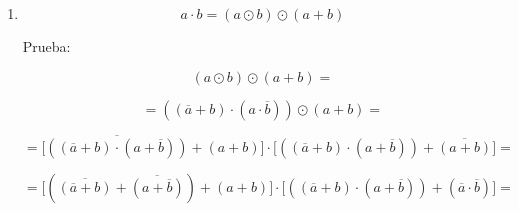 \documentclass[
]{article}
\begin{document}
\begin{enumerate}
\begin{enumerate}
\begin{enumerate}
\begin{enumerate}
        Prueba:

        \[{({a \oplus b})} \oplus {{({a \cdot b})} =}\]

        \[{= {({{({\overline{a} \cdot b})} + {({a \cdot \overline{b}})}})}} \oplus {{({a \cdot b})} =}\]

        \[{= {{\lbrack{\overline{({{({\overline{a}\cdot b})}+{({a\cdot\overline{b}})}})} \cdot {({a \cdot b})}}\rbrack} + {\lbrack{{({{({\overline{a} \cdot b})} + {({a \cdot \overline{b}})}})} \cdot \overline{({a\cdot b})}}\rbrack}}} =\]

        \[{= {{\lbrack{{({\overline{({\overline{a}\cdot b})} \cdot \overline{({a\cdot\overline{b}})}})} \cdot {({a \cdot b})}}\rbrack} + {\lbrack{{({{({\overline{a} \cdot b})} + {({a \cdot \overline{b}})}})} \cdot {({\overline{a} + \overline{b}})}}\rbrack}}} =\]

        \[{= {{\lbrack{{({{({a + \overline{b}})} \cdot {({\overline{a} + b})}})} \cdot {({a \cdot b})}}\rbrack} + {\lbrack{{({{({\overline{a} \cdot b})} + {({a \cdot \overline{b}})}})} \cdot {({\overline{a} + \overline{b}})}}\rbrack}}} =\]

        \[{= {{\lbrack{({a \cdot b})}\rbrack} + {\lbrack{({{({\overline{a} \cdot b})} + {({a \cdot \overline{b}})}})}\rbrack}}} =\]

        \[{= {{{({a \cdot b})} + {({\overline{a} \cdot b})}} + {({a \cdot \overline{b}})}}} =\]

        \[{= {{\lbrack{{({a \cdot b})} + {({\overline{a} \cdot b})}}\rbrack} + {\lbrack{{({a \cdot b})} + {({a \cdot \overline{b}})}}\rbrack}}} =\]

        \[{= {{\lbrack b\rbrack} + {\lbrack a\rbrack}}} =\]

        \[= {a + b}\]
      \item
        \[{{a \cdot b} = {({a \odot b})}} \odot {({a + b})}\]

        Prueba:

        \[{({a \odot b})} \odot {{({a + b})} =}\]

        \[{= {({{({\overline{a} + b})} \cdot {({a \cdot \overline{b}})}})}} \odot {{({a + b})} =}\]

        \[{= {{\lbrack{\overline{({{({\overline{a}+b})}\cdot{({a+\overline{b}})}})} + {({a + b})}}\rbrack} \cdot {\lbrack{{({{({\overline{a} + b})} \cdot {({a + \overline{b}})}})} + \overline{({a+b})}}\rbrack}}} =\]

        \[{= {{\lbrack{{({\overline{({\overline{a}+b})} + \overline{({a+\overline{b}})}})} + {({a + b})}}\rbrack} \cdot {\lbrack{{({{({\overline{a} + b})} \cdot {({a + \overline{b}})}})} + {({\overline{a} \cdot \overline{b}})}}\rbrack}}} =\]


\end{enumerate}
\end{enumerate}
\end{enumerate}
\end{enumerate}
\end{document}
